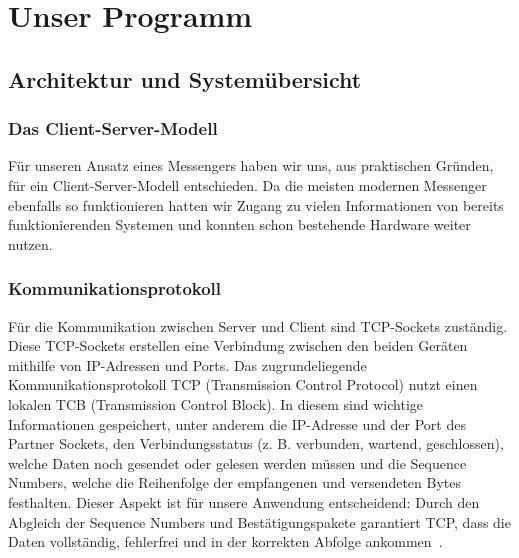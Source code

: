 \chapter{Unser Programm}

\section{Architektur und Systemübersicht}

\subsection{Das Client-Server-Modell}
Für unseren Ansatz eines Messengers haben wir uns, aus praktischen Gründen, für ein Client-Server-Modell entschieden. Da die meisten modernen 
Messenger ebenfalls so funktionieren hatten wir Zugang zu vielen Informationen von bereits funktionierenden Systemen und konnten schon 
bestehende Hardware weiter nutzen.


\subsection{Kommunikationsprotokoll}
Für die Kommunikation zwischen Server und Client sind TCP-Sockets zuständig. Diese TCP-Sockets erstellen eine Verbindung zwischen den beiden 
Geräten mithilfe von IP-Adressen und Ports. Das zugrundeliegende Kommunikationsprotokoll TCP (Transmission Control Protocol) nutzt einen lokalen 
TCB (Transmission Control Block). In diesem sind wichtige Informationen gespeichert, unter anderem die IP-Adresse und der Port des Partner 
Sockets, den Verbindungsstatus (z. B. verbunden, wartend, geschlossen), welche Daten noch gesendet oder gelesen werden müssen und die Sequence 
Numbers, welche die Reihenfolge der empfangenen und versendeten Bytes festhalten. Dieser Aspekt ist für unsere Anwendung entscheidend: Durch den 
Abgleich der Sequence Numbers und Bestätigungspakete garantiert TCP, dass die Daten vollständig, fehlerfrei und in der korrekten Abfolge ankommen~\cite{rfc9293}.  

